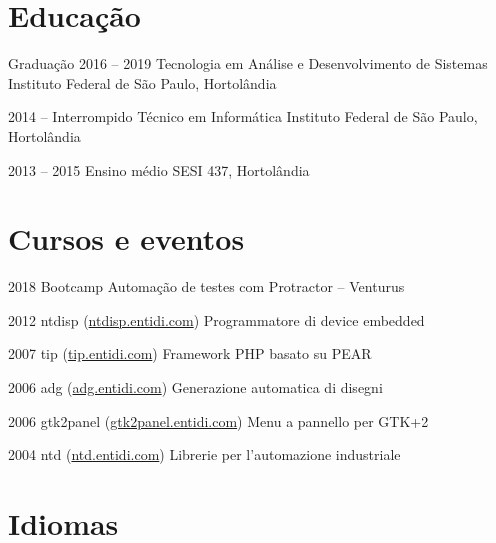 \documentclass[fontsize=10pt]{tccv}
\begin{document}
\section{Educação}

\begin{yearlist}

\item[Graduação]{2016 -- 2019}
     {Tecnologia em Análise e Desenvolvimento de Sistemas}
     {Instituto Federal de São Paulo, Hortolândia}

\item{2014 -- Interrompido}
     {Técnico em Informática}
     {Instituto Federal de São Paulo, Hortolândia}

\item{2013 -- 2015}
     {Ensino médio}
     {SESI 437, Hortolândia}

\end{yearlist}

\section{Cursos e eventos}

\begin{yearlist}

\item{2018}
     {Bootcamp Automação de testes com Protractor -- Venturus}

\item{2012}
     {ntdisp (\href{http://ntdisp.entidi.com/}{ntdisp.entidi.com})}
     {Programmatore di device embedded}

\item{2007}
     {tip (\href{http://tip.entidi.com/}{tip.entidi.com})}
     {Framework PHP basato su PEAR}

\item{2006}
     {adg (\href{http://adg.entidi.com/}{adg.entidi.com})}
     {Generazione automatica di disegni}

\item{2006}
     {gtk2panel (\href{http://gtk2panel.entidi.com/}{gtk2panel.entidi.com})}
     {Menu a pannello per GTK+2}

\item{2004}
     {ntd (\href{http://ntd.entidi.com/}{ntd.entidi.com})}
     {Librerie per l'automazione industriale}

\end{yearlist}

\section{Idiomas}
\end{document}
